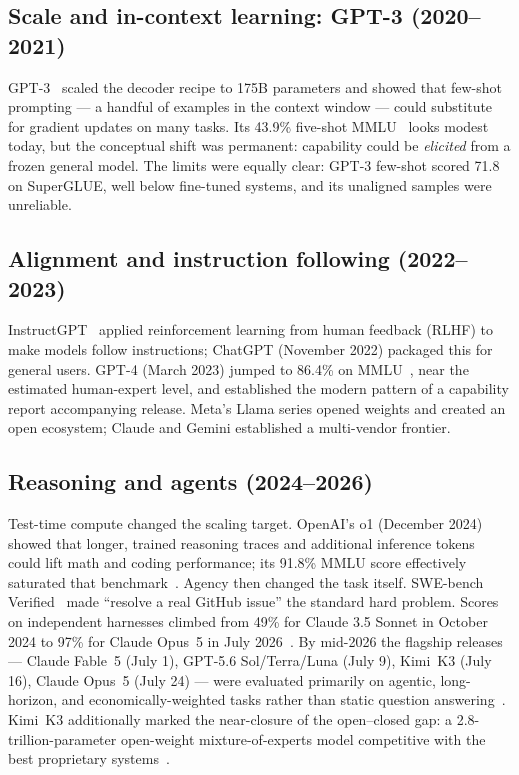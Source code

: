 \documentclass[11pt]{article}
\begin{document}
\subsection{Scale and in-context learning: GPT-3 (2020--2021)}
GPT-3~\cite{brown2020gpt3} scaled the decoder recipe to 175B parameters and
showed that few-shot prompting --- a handful of examples in the context window
--- could substitute for gradient updates on many tasks. Its 43.9\%
five-shot MMLU~\cite{hendrycks2021mmlu} looks modest today, but the conceptual
shift was permanent: capability could be \emph{elicited} from a frozen general
model. The limits were equally clear: GPT-3 few-shot scored 71.8 on SuperGLUE,
well below fine-tuned systems, and its unaligned samples were unreliable.

\subsection{Alignment and instruction following (2022--2023)}
InstructGPT~\cite{ouyang2022instructgpt} applied reinforcement learning from
human feedback (RLHF) to make models follow instructions; ChatGPT (November
2022) packaged this for general users. GPT-4 (March 2023) jumped to 86.4\% on
MMLU~\cite{openai2023gpt4}, near the estimated human-expert level, and
established the modern pattern of a capability report accompanying release.
Meta's Llama series opened weights and created an open ecosystem; Claude and
Gemini established a multi-vendor frontier.

\subsection{Reasoning and agents (2024--2026)}
Test-time compute changed the scaling target. OpenAI's o1 (December 2024)
showed that longer, trained reasoning traces and additional inference tokens
could lift math and coding performance; its 91.8\% MMLU score effectively
saturated that benchmark~\cite{benchlm_mmlu}. Agency then changed the task
itself. SWE-bench Verified~\cite{jimenez2024swebench,openai2024swebenchverified}
made ``resolve a real GitHub issue'' the standard hard problem. Scores on
independent harnesses climbed from 49\% for Claude 3.5 Sonnet in October 2024
to 97\% for Claude Opus~5 in July 2026~\cite{vals2026swebench}. By mid-2026
the flagship
releases --- Claude Fable~5 (July 1), GPT-5.6 Sol/Terra/Luna (July 9), Kimi~K3
(July 16), Claude Opus~5 (July 24) --- were evaluated primarily on agentic,
long-horizon, and economically-weighted tasks rather than static question
answering~\cite{anthropic2026fable5,openai2026gpt56,moonshot2026k3,anthropic2026opus5}.
Kimi~K3 additionally marked the near-closure of the open--closed gap: a
2.8-trillion-parameter open-weight mixture-of-experts model competitive with
the best proprietary systems~\cite{moonshot2026k3}.
\end{document}
